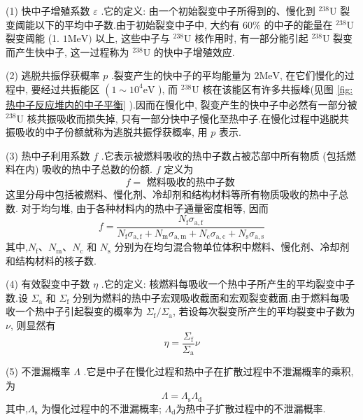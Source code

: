 \documentclass{Sichuan Normal University}
\begin{document}
(1) 快中子增殖系数 $\varepsilon$ .它的定义: 由一个初始裂变中子所得到的、慢化到 ${ }^{238} \mathrm{U}$ 裂变阈能以下的平均中子数.由于初始裂变中子中, 大约有 $60 \%$ 的中子的能量在 ${ }^{238} \mathrm{U}$ 裂变阈能 (1. $1 \mathrm{MeV})$ 以上, 这些中子与 ${ }^{238} \mathrm{U}$ 核作用时, 有一部分能引起 ${ }^{238} \mathrm{U}$ 裂变而产生快中子, 这一过程称为 ${ }^{238} \mathrm{U}$ 的快中子增殖效应.

(2) 逃脱共振俘获概率 $p$ .裂变产生的快中子的平均能量为 $2 \mathrm{MeV}$, 在它们慢化的过程中, 要经过共振能区 $\left(1 \sim 10^4 \mathrm{eV}\right.$ ), 而 ${ }^{238} \mathrm{U}$ 核在该能区有许多共振峰(见图 \ref{fig:热中子反应堆内的中子平衡} ).因而在慢化中, 裂变产生的快中子中必然有一部分被 ${ }^{238} \mathrm{U}$ 核共振吸收而损失掉, 只有一部分快中子慢化至热中子.在慢化过程中逃脱共振吸收的中子份额就称为逃脱共振俘获概率, 用 $p$ 表示.

(3) 热中子利用系数 $f$ .它表示被燃料吸收的热中子数占被芯部中所有物质 (包括燃料在内) 吸收的热中子总数的份额. $f$ 定义为
\begin{equation}
    f=\text { 燃料吸收的热中子数 }
\end{equation}
这里分母中包括被燃料、慢化剂、冷却剂和结构材料等所有物质吸收的热中子总数.
对于均匀堆, 由于各种材料内的热中子通量密度相等, 因而
\begin{equation}
    f=\frac{N_{\mathrm{f}} \sigma_{\mathrm{a}, \mathrm{f}}}{N_{\mathrm{f}} \sigma_{\mathrm{a}, \mathrm{f}}+N_{\mathrm{m}} \sigma_{\mathrm{a}, \mathrm{m}}+N_{\mathrm{c}} \sigma_{\mathrm{a}, \mathrm{c}}+N_{\mathrm{s}} \sigma_{\mathrm{a}, \mathrm{s}}}
\end{equation}
其中,$N_{\mathrm{f}} 、 N_{\mathrm{m}} 、 N_{\mathrm{c}}$ 和 $N_{\mathrm{s}}$ 分别为在均匀混合物单位体积中燃料、慢化剂、冷却剂和结构材料的核子数.

(4) 有效裂变中子数 $\eta$ .它的定义: 核燃料每吸收一个热中子所产生的平均裂变中子数.设 $\Sigma_{\mathrm{a}}$ 和 $\Sigma_{\mathrm{f}}$ 分别为燃料的热中子宏观吸收截面和宏观裂变截面.由于燃料每吸收一个热中子引起裂变的概率为 $\Sigma_{\mathrm{f}} / \Sigma_{\mathrm{a}}$, 若设每次裂变所产生的平均裂变中子数为 $\nu$, 则显然有
\begin{equation}
\eta=\frac{\Sigma_{\mathrm{f}}}{\Sigma_{\mathrm{a}}} \nu
\end{equation}

(5) 不泄漏概率 $\Lambda$ .它是中子在慢化过程和热中子在扩散过程中不泄漏概率的乘积, 为
\begin{equation}
\Lambda=\Lambda_{\mathrm{s}} \Lambda_{\mathrm{d}}
\end{equation}
其中,$\Lambda_{\mathrm{s}}$ 为慢化过程中的不泄漏概率; $\Lambda_{\mathrm{d}}$为热中子扩散过程中的不泄漏概率.
\end{document}
